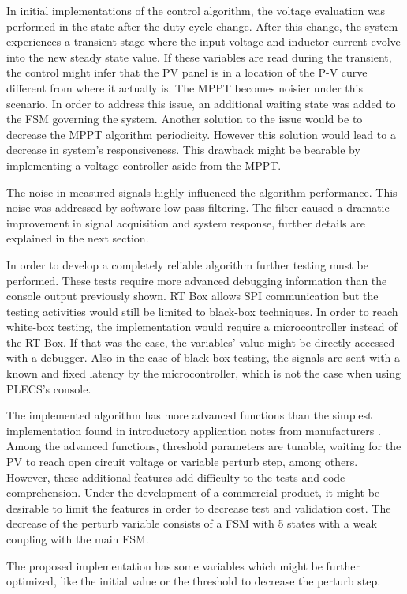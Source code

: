 In initial implementations of the control algorithm, the voltage evaluation was performed in the state after the duty cycle change. 
After this change, the system experiences a transient stage where the input voltage and inductor current evolve into the new steady state value. If these variables are read during the transient, the control might infer that the PV panel is in a location of the P-V curve different from where it actually is. 
The MPPT becomes noisier under this scenario. In order to address this issue, an additional waiting state was added to the FSM governing the system. 
Another solution to the issue would be to decrease the MPPT algorithm periodicity. However this solution would lead to a decrease in system's responsiveness. This drawback might be bearable by implementing a voltage controller aside from the MPPT.  

The noise in measured signals highly influenced the algorithm performance. This noise was addressed by software low pass filtering. The filter caused a dramatic improvement in signal acquisition and system response, further details are explained in the next section.

In order to develop a completely reliable algorithm further testing must be performed. These tests require more advanced debugging information than the console output previously shown. RT Box allows SPI communication but the testing activities would still be limited to black-box techniques. In order to reach white-box testing, the implementation would require a microcontroller instead of the RT Box. If that was the case, the variables' value might be directly accessed with a debugger. Also in the case of black-box testing, the signals are sent with a known and fixed latency by the microcontroller, which is not the case when using PLECS's console.

The implemented algorithm has more advanced functions than the simplest implementation found in introductory application notes from manufacturers \cite{AN1521_MC}. 
Among the advanced functions, threshold parameters are tunable, waiting for the PV to reach open circuit voltage or variable perturb step, among others. However, these additional features add difficulty to the tests and code comprehension. Under the development of a commercial product, it might be desirable to limit the features in order to decrease test and validation cost. The decrease of the perturb variable consists of a FSM with 5 states with a weak coupling with the main FSM.

The proposed implementation has some variables which might be further optimized, like the initial value or the threshold to decrease the perturb step. 


